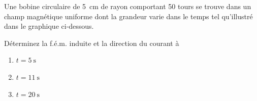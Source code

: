 \begin{diapobox}
  Une bobine circulaire de \SI{5}{\centi\meter} de rayon comportant \num{50}
  tours se trouve dans un champ magnétique uniforme dont la grandeur varie dans
  le temps tel qu'illustré dans le graphique ci-dessous.

  Déterminez la f.é.m. induite et la direction du courant à
  \begin{enumerate}
    \item $t = \SI{5}{\second}$
    \item $t = \SI{11}{\second}$
    \item $t = \SI{20}{\second}$
  \end{enumerate}
\end{diapobox}

